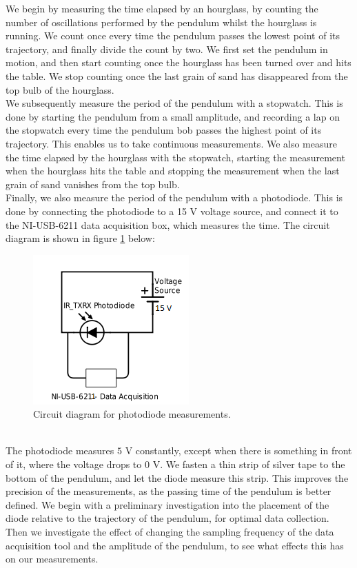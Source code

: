 \documentclass[a4paper, 10pt]{article}
\begin{document}
\linebreak
We begin by measuring the time elapsed by an hourglass, by counting the number of oscillations performed by the pendulum whilst the hourglass is running. We count once every time the pendulum passes the lowest point of its trajectory, and finally divide the count by two. We first set the pendulum in motion, and then start counting once the hourglass has been turned over and hits the table. We stop counting once the last grain of sand has disappeared from the top bulb of the hourglass.\\
\linebreak
We subsequently measure the period of the pendulum with a stopwatch. This is done by starting the pendulum from a small amplitude, and recording a lap on the stopwatch every time the pendulum bob passes the highest point of its trajectory. This enables us to take continuous measurements. We also measure the time elapsed by the hourglass with the stopwatch, starting the measurement when the hourglass hits the table and stopping the measurement when the last grain of sand vanishes from the top bulb.\\
\linebreak
Finally, we also measure the period of the pendulum with a photodiode.  This is done by connecting the photodiode to a 15 V voltage source, and connect it to the NI-USB-6211 data acquisition box, which measures  the time. The circuit diagram is shown in figure \ref{fig:Experiment_setup2} below:\\
\linebreak
\begin{figure}[ht!]
\centering
\includegraphics[scale=1]{schemeit-project.png}
\caption{Circuit diagram for photodiode measurements.}\label{fig:Experiment_setup2}
\end{figure}\\
The photodiode measures $5$ V constantly, except when there is something in front of it, where the voltage drops to $0$ V. We fasten a thin strip of silver tape to the bottom of the pendulum, and let the diode measure this strip. This improves the precision of the measurements, as the passing time of the pendulum is better defined.
We begin with a preliminary investigation into  the placement of the diode relative to the trajectory of the pendulum, for optimal data collection. Then we investigate the effect of changing the sampling frequency of the data acquisition tool and the amplitude of the pendulum, to see what effects this has on our measurements. 
\end{document}
